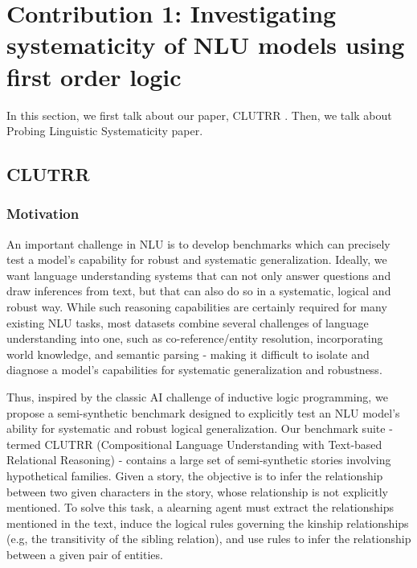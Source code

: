 \documentclass[12pt]{article}
\begin{document}
\section{Contribution 1: Investigating systematicity of NLU models using first order logic}
\label{sec:cont1}


In this section, we first talk about our paper, CLUTRR \cite{sinha2019a}. Then, we talk about Probing Linguistic Systematicity \cite{goodwin2020} paper.

\subsection{CLUTRR}

\subsubsection{Motivation}

An important challenge in NLU is to develop benchmarks which can precisely test a model's capability for robust and systematic generalization. Ideally, we want language understanding systems that can not only answer questions and draw inferences from text, but that can also do so in a systematic, logical and robust way. While such reasoning capabilities are certainly required for many existing NLU tasks, most datasets combine several challenges of language understanding into one, such as co-reference/entity resolution, incorporating world knowledge, and semantic parsing - making it difficult to isolate and diagnose a model's capabilities for systematic generalization and robustness.

Thus, inspired by the classic AI challenge of inductive logic programming, we propose a semi-synthetic benchmark designed to explicitly test an NLU model's ability for systematic and robust logical generalization. Our benchmark suite - termed CLUTRR (Compositional Language Understanding with Text-based Relational Reasoning) - contains a large set of semi-synthetic stories involving hypothetical families. Given a story, the objective is to infer the relationship between two given characters in the story, whose relationship is not explicitly mentioned. To solve this task, a alearning agent must extract the relationships mentioned in the text, induce the logical rules governing the kinship relationships (e.g, the transitivity of the sibling relation), and use rules to infer the relationship between a given pair of entities.
\end{document}
